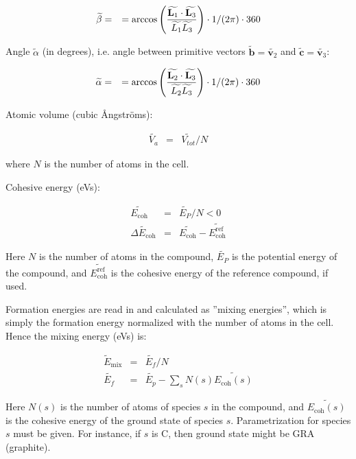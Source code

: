 \documentclass[a4paper,12pt,pdftex,onecolumn]{article}
\begin{document}
\begin{eqnarray}
\widetilde{\beta} &=&
= \arccos \left(
{ \widetilde{\mathbf{L}_1} \cdot \widetilde{\mathbf{L}_3} \over \widetilde{L_1} \widetilde{L_3} }
\right) \cdot 1/(2 \pi) \cdot 360
\end{eqnarray}

Angle $\widetilde{\alpha}$ (in degrees), i.e.
angle between primitive vectors
$\widetilde{\mathbf{b}} = \widetilde{\mathbf{v}_2}$ and
$\widetilde{\mathbf{c}} = \widetilde{\mathbf{v}_3}$:

\begin{eqnarray}
\widetilde{\alpha} &=&
= \arccos \left(
{ \widetilde{\mathbf{L}_2} \cdot \widetilde{\mathbf{L}_3} \over \widetilde{L_2} \widetilde{L_3} }
\right) \cdot 1/(2 \pi) \cdot 360
\end{eqnarray}

Atomic volume (cubic \AA{}ngstr\"oms):

\begin{eqnarray}
\widetilde{V_a} &=& \widetilde{V_{tot}}/N
\end{eqnarray}

where $N$ is the number of atoms in the cell.

Cohesive energy (eVs):

\begin{eqnarray}
\widetilde{E_{\mathrm{coh}}} &=& \widetilde{E_P}/N < 0\\
\widetilde{\Delta E_{\mathrm{coh}}}
&=& \widetilde{E_{\mathrm{coh}}} - \widetilde{E_{\mathrm{coh}}^{\mathrm{ref}}}
\end{eqnarray}

Here $N$ is the number of atoms in the compound,
$\widetilde{E_P}$ is the potential energy of the compound, and
$\widetilde{E_{\mathrm{coh}}^{\mathrm{ref}}}$ is the cohesive energy of the reference
compound, if used.

Formation energies are read in and calculated as ''mixing energies'',
which is simply the formation energy normalized with the number of atoms
in the cell. Hence the mixing energy (eVs) is:

\begin{eqnarray}
\widetilde{E}_{\mathrm{mix}} &=& \widetilde{E_f}/N \\
\widetilde{E_f} &=& \widetilde{E_p} - \sum_s N(s) \widetilde{E_{\mathrm{coh}}(s)}
\end{eqnarray}

Here $N(s)$ is the number of atoms of species $s$ in the compound, and
$\widetilde{E_{\mathrm{coh}}(s)}$ is the cohesive energy of the ground state of species $s$.
Parametrization for species $s$ must be given.
For instance, if $s$ is C, then ground state might be GRA (graphite).
\end{document}
